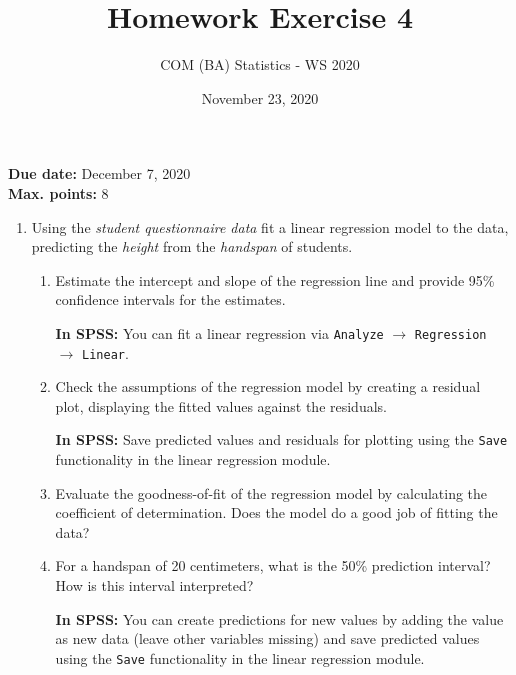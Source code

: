 \documentclass[a4paper, fleqn]{article}
\title{Homework Exercise 4}
\author{COM (BA) Statistics - WS 2020}
\date{November 23, 2020}
\begin{document}
\maketitle
\thispagestyle{empty}

\noindent
\textbf{Due date:} December 7, 2020 \\
\textbf{Max. points:} 8 \\

\begin{enumerate}
  \item Using the \textit{student questionnaire data} fit a linear regression model to the data, predicting the \textit{height} from the \textit{handspan} of students.
  \begin{enumerate}
    \item Estimate the intercept and slope of the regression line and provide 95\% confidence intervals for the estimates.

    \vspace{0.5em}
    \textbf{In SPSS:} You can fit a linear regression via \texttt{Analyze} $\rightarrow$ \texttt{Regression} $\rightarrow$ \texttt{Linear}. 

    \item Check the assumptions of the regression model by creating a residual plot, displaying the fitted values against the residuals. 

    \vspace{0.5em}
    \textbf{In SPSS:} Save predicted values and residuals for plotting using the \texttt{Save} functionality in the linear regression module.

    \item Evaluate the goodness-of-fit of the regression model by calculating the coefficient of determination. Does the model do a good job of fitting the data?

    \item For a handspan of 20 centimeters, what is the 50\% prediction interval? How is this interval interpreted? 

    \vspace{0.5em}
    \textbf{In SPSS:} You can create predictions for new values by adding the value as new data (leave other variables missing) and save predicted values using the \texttt{Save} functionality in the linear regression module.
  \end{enumerate}


\end{enumerate}
\end{document}
